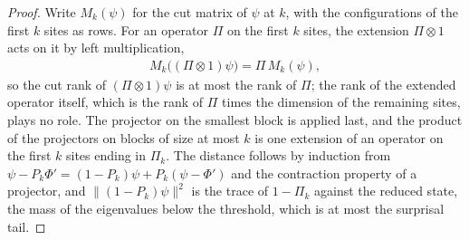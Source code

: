 \begin{proof}
    \leanok
    Write $M_k(\psi)$ for the cut matrix of $\psi$ at $k$, with the
    configurations of the first $k$ sites as rows. For an operator $\Pi$ on
    the first $k$ sites, the extension $\Pi\otimes1$ acts on it by left
    multiplication,
    \begin{align}
        M_k\bigl((\Pi\otimes1)\psi\bigr)=\Pi\,M_k(\psi),
    \end{align}
    so the cut rank of $(\Pi\otimes1)\psi$ is at most the rank of $\Pi$; the
    rank of the extended operator itself, which is the rank of $\Pi$ times the
    dimension of the remaining sites, plays no role. The projector on the
    smallest block is
    applied last, and the product of the projectors on blocks of size at most
    $k$ is one extension of an operator on the first $k$ sites ending in
    $\Pi_k$. The distance follows by induction from
    $\psi-P_k\Phi'=(1-P_k)\psi+P_k(\psi-\Phi')$ and the contraction property
    of a projector, and $\|(1-P_k)\psi\|^2$ is the trace of $1-\Pi_k$ against
    the reduced state, the mass of the eigenvalues below the threshold, which
    is at most the surprisal tail.
\end{proof}

